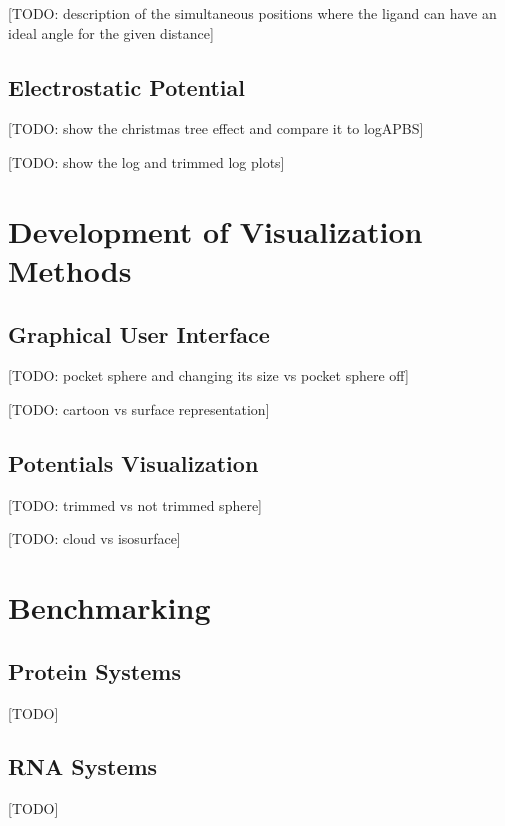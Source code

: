     [TODO: description of the simultaneous positions where the ligand can have an ideal angle for the given distance]

  \subsection{Electrostatic Potential}
    [TODO: show the christmas tree effect and compare it to logAPBS]

    [TODO: show the log and trimmed log plots]


\section{Development of Visualization Methods}
  \subsection{Graphical User Interface}
    [TODO: pocket sphere and changing its size vs pocket sphere off]

    [TODO: cartoon vs surface representation]


  \subsection{Potentials Visualization}
    [TODO: trimmed vs not trimmed sphere]

    [TODO: cloud vs isosurface]


\section{Benchmarking}
  \subsection{Protein Systems}
    [TODO]

  \subsection{RNA Systems}
    [TODO]


